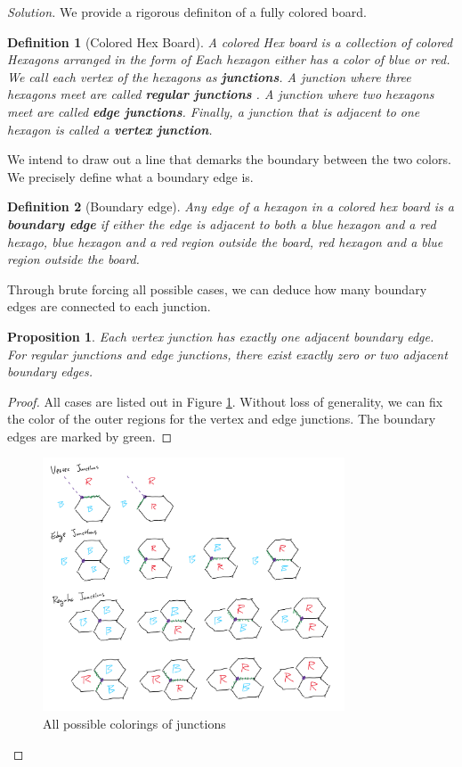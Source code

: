 \documentclass{article}
\newtheorem{proposition}{Proposition}
\newtheorem{definition}{Definition}
\begin{document}
\begin{proof}[Solution]
    We provide a rigorous definiton of a fully colored board. 

\begin{definition}[Colored Hex Board]
    A colored Hex board is a collection of colored Hexagons arranged in the form of %
    Each hexagon either has a color of blue or red. We call each vertex of the hexagons as \textbf{junctions}. A junction where three hexagons meet are called \textbf{regular junctions} . A junction where two hexagons meet are called \textbf{edge junctions}. Finally, a junction that is adjacent to one hexagon is called a \textbf{vertex junction}. 
\end{definition}

We intend to draw out a line that demarks the boundary between the two colors. We precisely define what a boundary edge is. 

\begin{definition}[Boundary edge] Any edge of a hexagon in a colored hex board is a \textbf{boundary edge} if either the edge is adjacent to both a blue hexagon and a red hexago, blue hexagon and a red region outside the board, red hexagon and a blue region outside the board.  
\end{definition}

Through brute forcing all possible cases, we can deduce how many boundary edges are connected to each junction. 
\begin{proposition}\label{thm:bdrycdn}
    Each vertex junction has exactly one adjacent boundary edge. For regular junctions and edge junctions, there exist exactly zero or two adjacent boundary edges. 
\end{proposition}
\begin{proof}
    All cases are listed out in Figure \ref{fig:junctionCases}. Without loss of generality, we can fix the color of the outer regions for the vertex and edge junctions. 
    The boundary edges are marked by green. 
\end{proof}

\begin{figure}[htp]
    \centering
    \includegraphics[width=0.8\textwidth]{JunctionCases.png} %
    \caption{All possible colorings of junctions}
    \label{fig:junctionCases}
\end{figure}


\end{proof}
\end{document}
